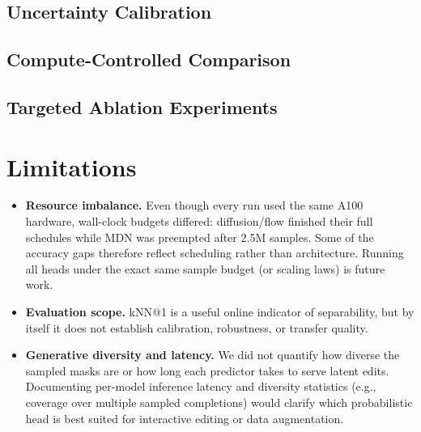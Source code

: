 \documentclass[conference]{IEEEtran}
\begin{document}
\subsection{Uncertainty Calibration}
\vspace{2mm}

\subsection{Compute-Controlled Comparison}
\vspace{2mm}

\subsection{Targeted Ablation Experiments}
\vspace{2mm}

\section{Limitations}

\begin{itemize}
    \item \textbf{Resource imbalance.} Even though every run used the same A100 hardware, wall-clock budgets differed: diffusion/flow finished their full schedules while MDN was preempted after 2.5M samples. Some of the accuracy gaps therefore reflect scheduling rather than architecture. Running all heads under the exact same sample budget (or scaling laws) is future work.
    \item \textbf{Evaluation scope.} kNN@1 is a useful online indicator of separability, but by itself it does not establish calibration, robustness, or transfer quality.
    \item \textbf{Generative diversity and latency.} We did not quantify how diverse the sampled masks are or how long each predictor takes to serve latent edits. Documenting per-model inference latency and diversity statistics (e.g., coverage over multiple sampled completions) would clarify which probabilistic head is best suited for interactive editing or data augmentation.
\end{itemize}
\end{document}

